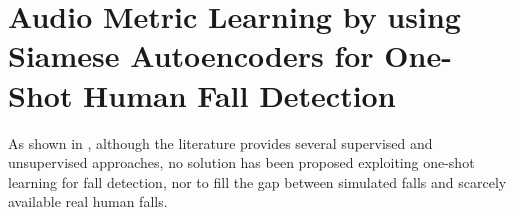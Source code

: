 \section{Audio Metric Learning by using Siamese Autoencoders
for One-Shot Human Fall Detection}
\label{sec:siamese_one_shot}

As shown in , although the literature provides several supervised and unsupervised approaches, no solution has been proposed exploiting one-shot learning for fall detection, nor to fill the gap between simulated falls and scarcely available real human falls.